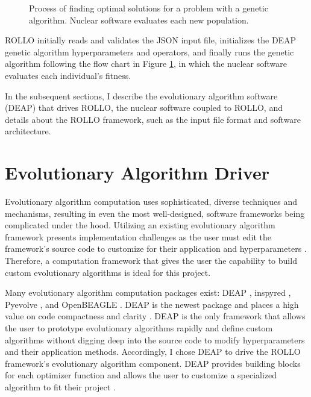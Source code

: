 \begin{figure}[]
    \caption{Process of finding optimal solutions for a problem with a 
    genetic algorithm. Nuclear software evaluates each new population.}
    \label{fig:genetic_alg_nuclear}
\end{figure}
\gls{ROLLO} initially reads and validates the JSON input 
file, initializes the \gls{DEAP} \cite{fortin_deap_2012} genetic algorithm 
hyperparameters and operators, and finally runs the genetic algorithm following 
the flow chart in Figure \ref{fig:genetic_alg_nuclear}, in which the nuclear 
software evaluates each individual's fitness. 

In the subsequent sections, I describe the evolutionary algorithm software (DEAP)
that drives \gls{ROLLO}, the nuclear software coupled to \gls{ROLLO}, and details about 
the \gls{ROLLO} framework, such as the input file format and software architecture. 

\section{Evolutionary Algorithm Driver}
Evolutionary algorithm computation uses sophisticated, diverse techniques 
and mechanisms, resulting in even the most well-designed, software frameworks 
being complicated under the hood. 
Utilizing an existing evolutionary algorithm framework presents implementation 
challenges as the user must edit the framework's source code to customize for their 
application and hyperparameters \cite{fortin_deap_2012}. 
Therefore, a computation framework that gives the user the capability to build 
custom evolutionary algorithms is ideal for this project.

Many evolutionary algorithm computation packages exist: 
\gls{DEAP} \cite{fortin_deap_2012}, inspyred \cite{garrett_inspyred_2014}, 
Pyevolve \cite{perone_pyevolve_2009}, and OpenBEAGLE \cite{gagne_open_2002}.
\gls{DEAP} is the newest package and places a high value on code 
compactness and clarity \cite{fortin_deap_2012}. 
\gls{DEAP} is the only framework that allows the user to prototype evolutionary 
algorithms rapidly and define custom algorithms without digging deep into 
the source code to modify hyperparameters and their application methods.
Accordingly, I chose \gls{DEAP} to drive the \gls{ROLLO} framework's 
evolutionary algorithm component. 
\gls{DEAP} provides building blocks for each optimizer function and allows the 
user to customize a specialized algorithm to fit their project \cite{fortin_deap_2012}.

